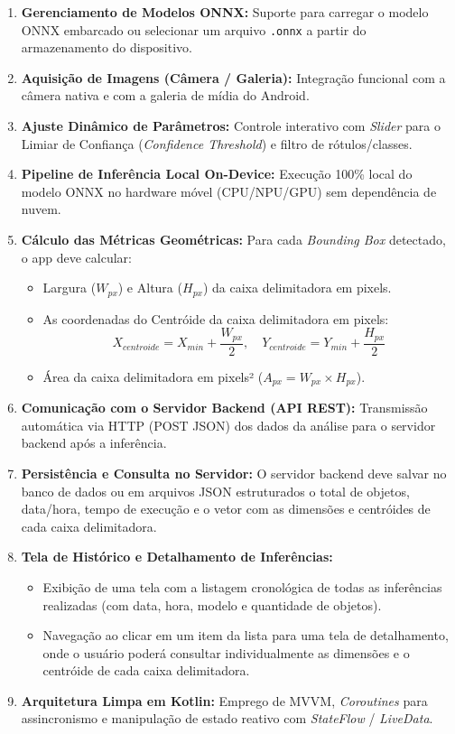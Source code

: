 \documentclass[12pt]{article}
\begin{document}
\begin{enumerate}[label=\textbf{RF\arabic*:}]
    \item \textbf{Gerenciamento de Modelos ONNX:} Suporte para carregar o modelo ONNX embarcado ou selecionar um arquivo \texttt{.onnx} a partir do armazenamento do dispositivo.
    \item \textbf{Aquisição de Imagens (Câmera / Galeria):} Integração funcional com a câmera nativa e com a galeria de mídia do Android.
    \item \textbf{Ajuste Dinâmico de Parâmetros:} Controle interativo com \textit{Slider} para o Limiar de Confiança (\textit{Confidence Threshold}) e filtro de rótulos/classes.
    \item \textbf{Pipeline de Inferência Local On-Device:} Execução 100\% local do modelo ONNX no hardware móvel (CPU/NPU/GPU) sem dependência de nuvem.
    \item \textbf{Cálculo das Métricas Geométricas:} Para cada \textit{Bounding Box} detectado, o app deve calcular:
    \begin{itemize}
        \item Largura ($W_{px}$) e Altura ($H_{px}$) da caixa delimitadora em pixels.
        \item As coordenadas do Centróide da caixa delimitadora em pixels:
        \begin{equation}
            X_{centroide} = X_{min} + \frac{W_{px}}{2}, \quad Y_{centroide} = Y_{min} + \frac{H_{px}}{2}
        \end{equation}
        \item Área da caixa delimitadora em pixels² ($A_{px} = W_{px} \times H_{px}$).
    \end{itemize}
    \item \textbf{Comunicação com o Servidor Backend (API REST):} Transmissão automática via HTTP (POST JSON) dos dados da análise para o servidor backend após a inferência.
    \item \textbf{Persistência e Consulta no Servidor:} O servidor backend deve salvar no banco de dados ou em arquivos JSON estruturados o total de objetos, data/hora, tempo de execução e o vetor com as dimensões e centróides de cada caixa delimitadora.
    \item \textbf{Tela de Histórico e Detalhamento de Inferências:}
    \begin{itemize}
        \item Exibição de uma tela com a listagem cronológica de todas as inferências realizadas (com data, hora, modelo e quantidade de objetos).
        \item Navegação ao clicar em um item da lista para uma tela de detalhamento, onde o usuário poderá consultar individualmente as dimensões e o centróide de cada caixa delimitadora.
    \end{itemize}
    \item \textbf{Arquitetura Limpa em Kotlin:} Emprego de MVVM, \textit{Coroutines} para assincronismo e manipulação de estado reativo com \textit{StateFlow} / \textit{LiveData}.
\end{enumerate}
\end{document}
